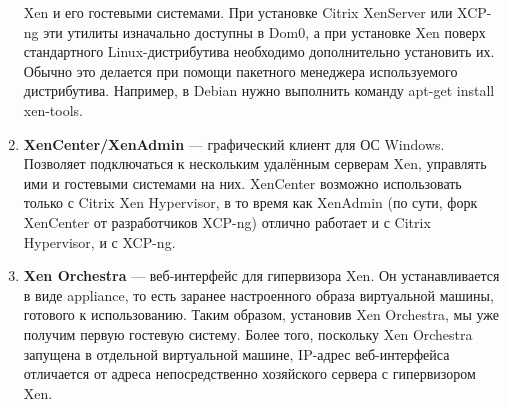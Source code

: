 \documentclass[14pt, a4paper]{article}
\begin{document}
\begin{enumerate}
    Xen и его гостевыми системами. При установке Citrix XenServer или XCP-ng эти утилиты
    изначально доступны в Dom0, а при установке Xen поверх стандартного Linux-дистрибутива
    необходимо дополнительно установить их. Обычно это делается при помощи пакетного
    менеджера используемого дистрибутива. Например, в Debian нужно выполнить команду
    \colorbox{backcolour}{apt-get install xen-tools}.
    \item \textbf{XenCenter/XenAdmin} — графический клиент для ОС Windows. Позволяет подключаться к
    нескольким удалённым серверам Xen, управлять ими и гостевыми системами на них.
    XenCenter возможно использовать только с Citrix Xen Hypervisor, в то время как XenAdmin (по
    сути, форк XenCenter от разработчиков XCP-ng) отлично работает и с Citrix Hypervisor, и с
    XCP-ng.
    \begin{figure}[h]%
        \centering
        \label{2.3} %
    \end{figure}
    \item \textbf{Xen Orchestra} — веб-интерфейс для гипервизора Xen. Он устанавливается в виде appliance,
    то есть заранее настроенного образа виртуальной машины, готового к использованию. Таким
    образом, установив Xen Orchestra, мы уже получим первую гостевую систему. Более того,
    поскольку Xen Orchestra запущена в отдельной виртуальной машине, IP-адрес
    веб-интерфейса отличается от адреса непосредственно хозяйского сервера с гипервизором
    Xen.
    \begin{figure}[h]%
        \centering

\end{figure}
\end{enumerate}
\end{document}
